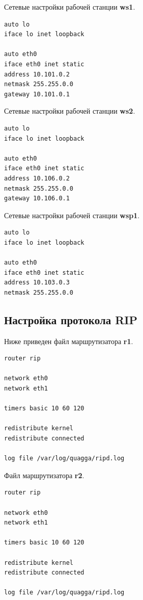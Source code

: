 \documentclass[a4paper,12pt]{article}
\begin{document}
Сетевые настройки рабочей станции \textbf{ws1}.

\begin{Verbatim}
auto lo
iface lo inet loopback

auto eth0
iface eth0 inet static
address 10.101.0.2
netmask 255.255.0.0
gateway 10.101.0.1    
\end{Verbatim}

Сетевые настройки рабочей станции \textbf{ws2}.

\begin{Verbatim}
auto lo
iface lo inet loopback

auto eth0
iface eth0 inet static
address 10.106.0.2
netmask 255.255.0.0
gateway 10.106.0.1
\end{Verbatim}

Сетевые настройки рабочей станции \textbf{wsp1}.

\begin{Verbatim}
auto lo
iface lo inet loopback

auto eth0
iface eth0 inet static
address 10.103.0.3
netmask 255.255.0.0
\end{Verbatim}

\subsection{Настройка протокола RIP}


Ниже приведен файл  маршрутизатора \textbf{r1}.

\begin{Verbatim}
router rip

network eth0
network eth1
    
timers basic 10 60 120
    
redistribute kernel
redistribute connected
    
log file /var/log/quagga/ripd.log    
\end{Verbatim}


Файл  маршрутизатора \textbf{r2}.

\begin{Verbatim}
router rip

network eth0
network eth1
    
timers basic 10 60 120
    
redistribute kernel
redistribute connected
    
log file /var/log/quagga/ripd.log    
\end{Verbatim}
\end{document}
